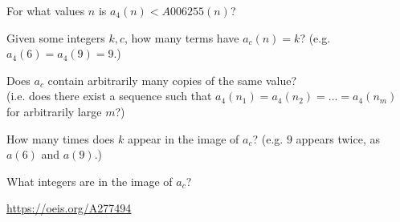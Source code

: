 \documentclass{article}
\begin{document}
\begin{related}
  \item For what values $n$ is $a_4(n) < A006255(n)$?
  \item Given some integers $k, c$, how many terms have $a_c(n) = k$?
    (e.g. $a_4(6) = a_4(9) = 9$.)
  \item Does $a_c$ contain arbitrarily many copies of the same value? \\
    (i.e. does there exist a sequence such that
    $a_4(n_1) = a_4(n_2) = \hdots = a_4(n_m)$ for arbitrarily large $m$?)
  \item How many times does $k$ appear in the image of $a_c$?
    (e.g. $9$ appears twice, as $a(6)$ and $a(9)$.)
  \item What integers are in the image of $a_c$?
\end{related}

\begin{references}
  \item \url{https://oeis.org/A277494}
\end{references}
\end{document}

